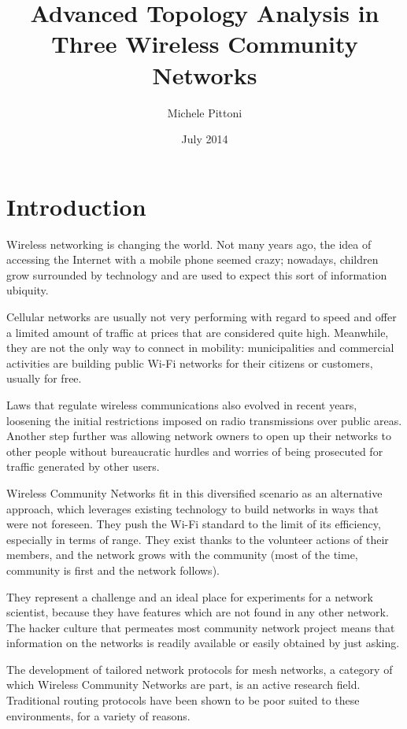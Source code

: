 \documentclass[a4paper,11pt,twoside,openleft]{memoir}
\title{Advanced Topology Analysis in Three Wireless Community Networks}
\author{Michele Pittoni}
\date{July 2014}
\begin{document}

\cleardoublepage

\tableofcontents

\chapter*{Introduction}\label{introduction}

Wireless networking is changing the world. Not many years ago, the idea of
accessing the Internet with a mobile phone seemed crazy; nowadays, children
grow surrounded by technology and are used to expect this sort of information
ubiquity.

Cellular networks are usually not very performing with regard to speed and offer
a limited amount of traffic at prices that are considered quite high.
Meanwhile, they are not the only way to connect in mobility: municipalities
and commercial activities are building public Wi-Fi networks for their
citizens or customers, usually for free.

Laws that regulate wireless communications also evolved in recent years,
loosening the initial restrictions imposed on radio transmissions over
public areas.
Another step further was allowing network owners to open up their
networks to other people without bureaucratic hurdles and worries of being
prosecuted for traffic generated by other users.

Wireless Community Networks fit in this diversified scenario as an alternative
approach, which leverages existing technology to build networks in ways that 
were not foreseen.
They push the Wi-Fi standard to the limit of its efficiency, especially
in terms of range. They exist thanks to the volunteer actions of their members,
and the network grows with the community (most of the time, community is
first and the network follows).

They represent a challenge and an ideal place for experiments for a network
scientist, because they have features which are not found in any other network.
The hacker culture that permeates most community network project means that
information on the networks is readily available or easily obtained by just
asking.

The development of tailored network protocols for mesh networks, a category
of which Wireless Community Networks are part, is an active research field.
Traditional routing protocols have been shown to be poor suited to these
environments, for a variety of reasons.
\end{document}

